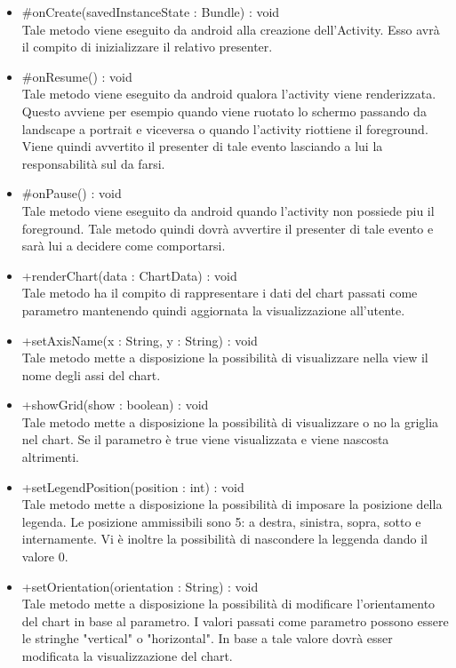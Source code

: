 \begin{itemize}
\begin{itemize}
					\item[\ding{111}] {{\#onCreate(savedInstanceState : Bundle) : void}} \\ [1mm] Tale metodo viene eseguito da android alla creazione dell'Activity. Esso avrà il compito di inizializzare il relativo presenter. 
					\item[\ding{111}] {{\#onResume() : void}} \\ [1mm] Tale metodo viene eseguito da android qualora l'activity viene renderizzata. Questo avviene per esempio quando viene ruotato lo schermo passando da landscape a portrait e viceversa o quando l'activity riottiene il foreground. Viene quindi avvertito il presenter di tale evento lasciando a lui la responsabilità sul da farsi.
					\item[\ding{111}] {{\#onPause() : void}} \\ [1mm] Tale metodo viene eseguito da android quando l'activity non possiede piu il foreground. Tale metodo quindi dovrà avvertire il presenter di tale evento e sarà lui a decidere come comportarsi.
					\item[\ding{111}] {{+renderChart(data : ChartData) : void}} \\ [1mm] Tale metodo ha il compito di rappresentare i dati del chart passati come parametro mantenendo quindi aggiornata la visualizzazione all'utente.
					\item[\ding{111}] {{+setAxisName(x : String, y : String) : void}} \\ [1mm] Tale metodo mette a disposizione la possibilità di visualizzare nella view il nome degli assi del chart.
					\item[\ding{111}] {{+showGrid(show : boolean) : void}} \\ [1mm] Tale metodo mette a disposizione la possibilità di visualizzare o no la griglia nel chart. Se il parametro è true viene visualizzata e viene nascosta altrimenti.
					\item[\ding{111}] {{+setLegendPosition(position : int) : void}} \\ [1mm] Tale metodo mette a disposizione la possibilità di imposare la posizione della legenda. Le posizione ammissibili sono 5: a destra, sinistra, sopra, sotto e internamente. Vi è inoltre la possibilità di nascondere la leggenda dando il valore 0.
					\item[\ding{111}] {{+setOrientation(orientation : String) : void}} \\ [1mm] Tale metodo mette a disposizione la possibilità di modificare l'orientamento del chart in base al parametro. I valori passati come parametro possono essere le stringhe "vertical" o "horizontal". In base a tale valore dovrà esser modificata la visualizzazione del chart.

\end{itemize}
\end{itemize}
